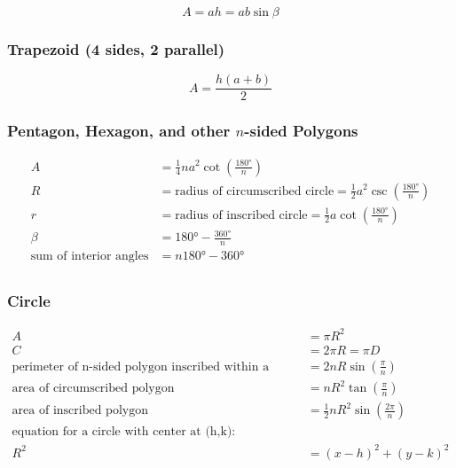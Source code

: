 \documentclass[
]{book}
\begin{document}
\[ A = ah = ab \sin \beta \]

\hypertarget{trapezoid-4-sides-2-parallel}{%
\subsubsection*{Trapezoid (4 sides, 2 parallel)}\label{trapezoid-4-sides-2-parallel}}

\[ A = \frac{h \left(a + b \right)}{2} \]

\hypertarget{pentagon-hexagon-and-other-n-sided-polygons}{%
\subsubsection*{\texorpdfstring{Pentagon, Hexagon, and other \(n\)-sided Polygons}{Pentagon, Hexagon, and other n-sided Polygons}}\label{pentagon-hexagon-and-other-n-sided-polygons}}

\begin{align}
A &= \frac{1}{4} n a^2 \cot \left( \frac{180°}{n} \right) \\
R &= \text{radius of circumscribed circle} = \frac{1}{2} a^2 \csc \left( \frac{180°}{n} \right) \\
r &= \text{radius of inscribed circle} = \frac{1}{2} a \cot \left( \frac{180°}{n} \right) \\
\beta &= 180° - \frac{360°}{n} \\
\text{sum of interior angles} &= n 180° - 360° \\
\end{align}

\hypertarget{circle}{%
\subsubsection*{Circle}\label{circle}}

\begin{align}
A &= \pi R^2 \\
C &= 2 \pi R = \pi D \\
\text{perimeter of n-sided polygon inscribed within a circle} &= 2 n R \sin \left(\frac{\pi}{n} \right) \\
\text{area of circumscribed polygon} &= n R^2 \tan \left( \frac{\pi}{n} \right) \\
\text{area of inscribed polygon} &= \frac{1}{2} n R^2 \sin \left( \frac{2\pi}{n} \right) \\
\text{equation for a circle with center at (h,k):} \\
R^2  &= \left(x-h \right)^2  + \left(y-k \right)^2 \\
\end{align}
\end{document}
